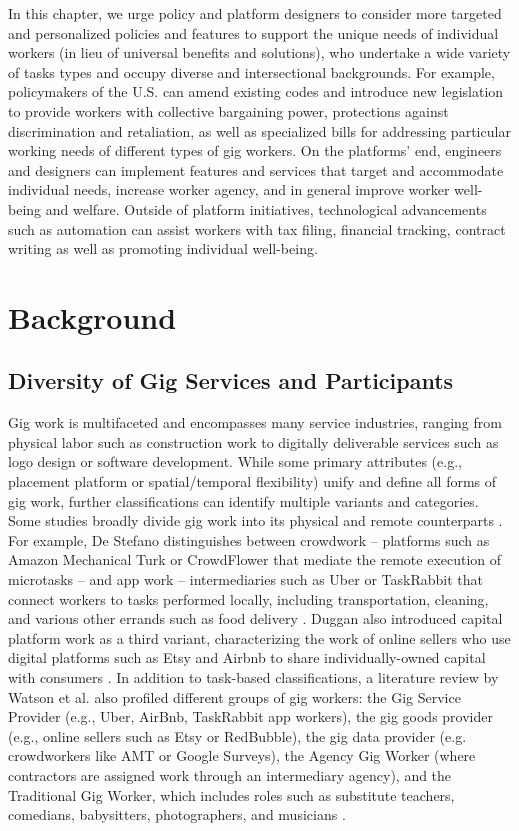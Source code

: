 In this chapter, we urge policy and platform designers to consider more targeted and personalized policies and features to support the unique needs of individual workers (in lieu of universal benefits and solutions), who undertake a wide variety of tasks types and occupy diverse and intersectional backgrounds. For example, policymakers of the U.S. can amend existing codes and introduce new legislation to provide workers with collective bargaining power, protections against discrimination and retaliation, as well as specialized bills for addressing particular working needs of different types of gig workers. On the platforms' end, engineers and designers can implement features and services that target and accommodate individual needs, increase worker agency, and in general improve worker well-being and welfare. Outside of platform initiatives, technological advancements such as automation can assist workers with tax filing, financial tracking, contract writing as well as promoting individual well-being.

\section{Background}
\subsection{Diversity of Gig Services and Participants}
Gig work is multifaceted and encompasses many service industries, ranging from physical labor such as construction work to digitally deliverable services such as logo design or software development. While some primary attributes (e.g., placement platform or spatial/temporal flexibility) unify and define all forms of gig work, further classifications can identify multiple variants and categories. Some studies broadly divide gig work into its physical and remote counterparts \cite{Fauzi2022-vd,personal}. For example, De Stefano distinguishes between crowdwork – platforms such as Amazon Mechanical Turk or CrowdFlower that mediate the remote execution of microtasks – and app work – intermediaries such as Uber or TaskRabbit that connect workers to tasks performed locally, including transportation, cleaning, and various other errands such as food delivery \cite{9Fa7}. Duggan also introduced capital platform work as a third variant, characterizing the work of online sellers who use digital platforms such as Etsy and Airbnb to share individually-owned capital with consumers \cite{Duggan2020-qh,Maffie2020-ap}. In addition to task-based classifications, a literature review by Watson et al. also profiled different groups of gig workers: the Gig Service Provider (e.g., Uber, AirBnb, TaskRabbit app workers), the gig goods provider (e.g., online sellers such as Etsy or RedBubble), the gig data provider (e.g. crowdworkers like AMT or Google Surveys), the Agency Gig Worker (where contractors are assigned work through an intermediary agency), and the Traditional Gig Worker, which includes roles such as substitute teachers, comedians, babysitters, photographers, and musicians \cite{Watson2021-kr}.

